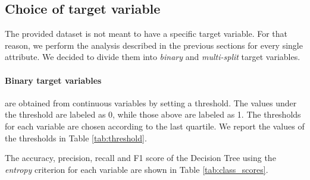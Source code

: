 \documentclass[a4paper,11pt,dvipsnames]{article}
\begin{document}
\subsection{Choice of target variable}\label{target_dt}

The provided dataset is not meant to have a specific target variable. For that reason, we perform the analysis described in the previous sections for every single attribute. We decided to divide them into \textit{binary} and \textit{multi-split} target variables. 

\paragraph{Binary target variables} are obtained from continuous variables by setting a threshold. The values under the threshold are labeled as 0, while those above are labeled as 1. The thresholds for each variable are chosen according to the last quartile. We report the values of the thresholds in Table \ref{tab:threshold}.

\begin{table}[h]
            \caption{Thresholds used for the binary split}\label{tab:threshold}
    \end{table}


The accuracy, precision, recall and F1 score of the Decision Tree using the \textit{entropy} criterion for each variable are shown in Table \ref{tab:class_scores}.
\end{document}
